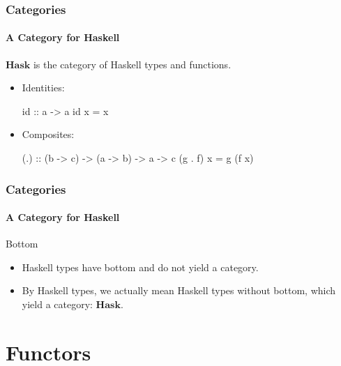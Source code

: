 \documentclass{beamer}
\newcommand{\catbf}[1]{\ensuremath{\mathbf{#1}}\xspace}
\newcommand{\hask}{\catbf{Hask}}
\begin{document}

\begin{frame}[fragile]
  \frametitle{Categories}
  \framesubtitle{A Category for Haskell}

  \begin{example}
    \hask is the category of Haskell types and functions.
    \begin{itemize}
    \item
      Identities:
      \begin{code}
id :: a -> a
id x = x
      \end{code}
    \item
      Composites:
      \begin{code}
(.) :: (b -> c) -> (a -> b) -> a -> c
(g . f) x = g (f x)
      \end{code}
    \end{itemize}
  \end{example}

\end{frame}


\begin{frame}[label={bottom}]
  \frametitle{Categories}
  \framesubtitle{A Category for Haskell}

  \begin{block}{Bottom}
    \begin{itemize}
    \item
      Haskell types have bottom and do not yield a category.
    \end{itemize}
    \begin{itemize}
    \item
      By Haskell types, we actually mean Haskell types without bottom,
      which yield a category: \hask.
    \end{itemize}
    \vfill\hfill\hyperlink{re:hask}{}
  \end{block}

\end{frame}


\section{Functors}
\end{document}
